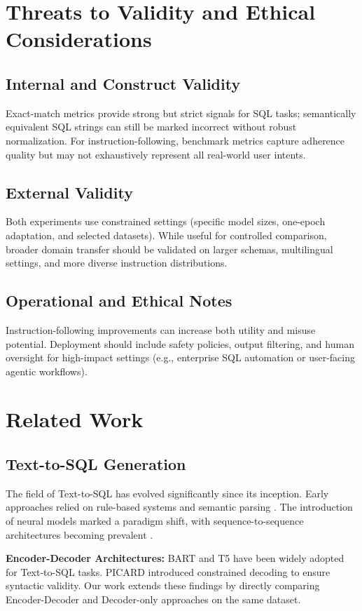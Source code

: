 \documentclass[conference]{IEEEtran}
\begin{document}
\section{Threats to Validity and Ethical Considerations}
\subsection{Internal and Construct Validity}
Exact-match metrics provide strong but strict signals for SQL tasks; semantically equivalent SQL strings can still be marked incorrect without robust normalization. For instruction-following, benchmark metrics capture adherence quality but may not exhaustively represent all real-world user intents.

\subsection{External Validity}
Both experiments use constrained settings (specific model sizes, one-epoch adaptation, and selected datasets). While useful for controlled comparison, broader domain transfer should be validated on larger schemas, multilingual settings, and more diverse instruction distributions.

\subsection{Operational and Ethical Notes}
Instruction-following improvements can increase both utility and misuse potential. Deployment should include safety policies, output filtering, and human oversight for high-impact settings (e.g., enterprise SQL automation or user-facing agentic workflows).

\section{Related Work}

\subsection{Text-to-SQL Generation}
The field of Text-to-SQL has evolved significantly since its inception. Early approaches relied on rule-based systems and semantic parsing \cite{zhong2017seq2sql}. The introduction of neural models marked a paradigm shift, with sequence-to-sequence architectures becoming prevalent \cite{yu2018spider}.

\textbf{Encoder-Decoder Architectures:} BART \cite{lewis2019bart} and T5 \cite{raffel2019exploring} have been widely adopted for Text-to-SQL tasks. PICARD \cite{scholak2021picard} introduced constrained decoding to ensure syntactic validity. Our work extends these findings by directly comparing Encoder-Decoder and Decoder-only approaches on the same dataset.
\end{document}
